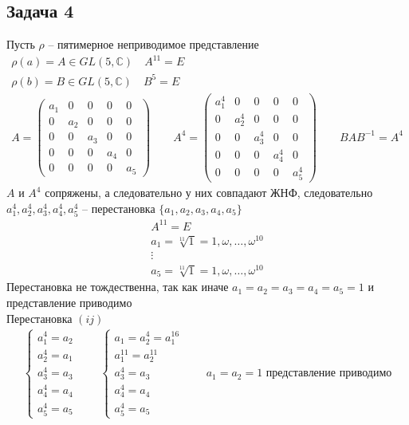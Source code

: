 \subsection*{Задача 4}
	Пусть $\rho$ -- пятимерное неприводимое представление
	\begin{gather*}
		\rho(a) = A \in GL(5,\mathbb{C})\quad A^{11} = E\\
		\rho(b) = B \in GL(5,\mathbb{C})\quad B^{5} = E\\
		A =
		\begin{pmatrix}
			a_1 & 0 & 0 & 0 & 0\\
			0 & a_2 & 0 & 0 & 0\\
			0 & 0 & a_3 & 0 & 0\\
			0 & 0 & 0 & a_4 & 0\\
			0 & 0 & 0 & 0 & a_5
		\end{pmatrix}\qquad
		A^4 = 
		\begin{pmatrix}
			a_1^4 & 0 & 0 & 0 & 0\\
			0 & a_2^4 & 0 & 0 & 0\\
			0 & 0 & a_3^4 & 0 & 0\\
			0 & 0 & 0 & a_4^4 & 0\\
			0 & 0 & 0 & 0 & a_5^4
		\end{pmatrix}\qquad
		BAB^{-1} = A^{4}
	\end{gather*}
	$A$ и $A^4$ сопряжены, а следовательно у них совпадают ЖНФ, следовательно ${a_1^4, a_2^4, a_3^4, a_4^4, a_5^4}$ -- перестановка $\{a_1,a_2,a_3,a_4,a_5\}$
	\begin{gather*}
		A^{11} = E\\
		a_1 = \sqrt[11]{1} = 1,\omega,\ldots,\omega^{10}\\
		\vdots\\
		a_5 = \sqrt[11]{1} = 1,\omega,\ldots,\omega^{10}
	\end{gather*}
	Перестановка не тождественна, так как иначе $a_1 = a_2 = a_3 = a_4 = a_5 = 1$ и представление приводимо\\
	Перестановка $(ij)$
	\begin{gather*}
		\begin{cases}
			a_1^4 = a_2\\
			a_2^4 = a_1\\
			a_3^4 = a_3\\
			a_4^4 = a_4\\
			a_5^4 = a_5
		\end{cases}\qquad
		\begin{cases}
			a_1 = a_2^4 = a_1^{16}\\
			a_1^{11} = a_2^{11}\\
			a_3^4 = a_3\\
			a_4^4 = a_4\\
			a_5^4 = a_5
		\end{cases}\qquad
		a_1 = a_2 = 1
		\text{ представление приводимо}
	\end{gather*}
